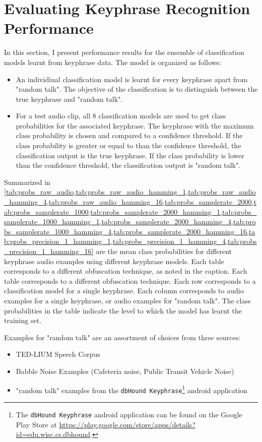 

\section{Evaluating Keyphrase Recognition Performance}
\label{sec:recognition_evaluation}

In this section, I present performance results for the ensemble of classification models learnt from keyphrase data.
 The model is organized as follows:

\begin{itemize}
\item An individiual classification model is learnt for every keyphrase apart from "random talk".
 The objective of the classification is to distinguish between the true keyphrase and "random talk".
\item For a test audio clip, all 8 classification models are used to get class probabilities for the associated keyphrase.
 The keyphrase with the maximum class probability is chosen and compared to a confidence threshold.
 If the class probability is greater or equal to than the confidence threshold, the classification output is the true keyphrase.
 If the class probability is lower than the confidence threshold, the classification output is "random talk".
\end{itemize}


Summarized in \cref{tab:probs_raw_audio,tab:probs_raw_audio_hamming_1,tab:probs_raw_audio_hamming_4,tab:probs_raw_audio_hamming_16,tab:probs_samplerate_2000,tab:probs_samplerate_1000,tab:probs_samplerate_2000_hamming_1,tab:probs_samplerate_1000_hamming_1,tab:probs_samplerate_2000_hamming_4,tab:probs_samplerate_1000_hamming_4,tab:probs_samplerate_2000_hamming_16,tab:probs_precision_1_hamming_1,tab:probs_precision_1_hamming_4,tab:probs_precision_1_hamming_16}
 are the mean class probabilities for different keyphrase audio examples using different keyphrase models.
 Each table corresponds to a different obfuscation technique, as noted in the caption.
 Each table corresponds to a different obfuscation technique.
 Each row corresponds to a classification model for a single keyphrase.
 Each column corresponds to audio examples for a single keyphrase, or audio examples for "random talk".
 The class probabilities in the table indicate the level to which the model has learnt the training set.


Examples for "random talk" are an assortment of choices from three sources:
\begin{itemize}
\item TED-LIUM Speech Corpus
\item Babble Noise Examples (Cafeteria noise, Public Transit Vehicle Noise)
\item "random talk" examples from the \texttt{dbHound Keyphrase}\footnote{The \texttt{dbHound Keyphrase} android application can be found on the Google Play Store at \url{https://play.google.com/store/apps/details?id=edu.wisc.cs.dbhound}.} android application
\end{itemize}

